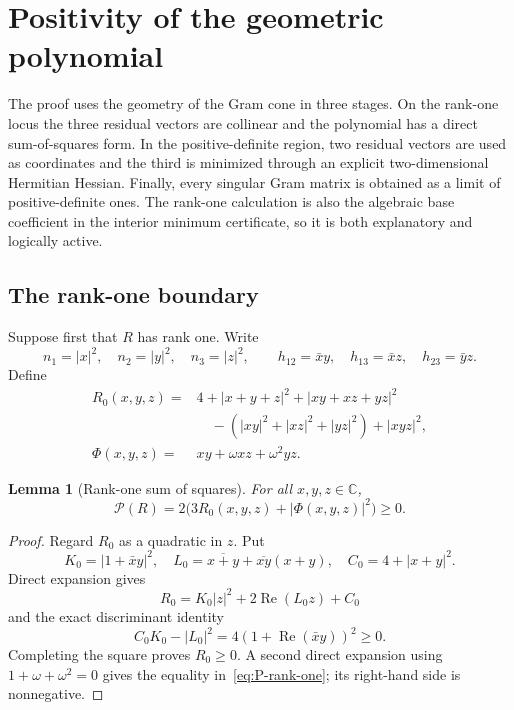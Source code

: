 \documentclass[11pt]{article}
\newtheorem{lemma}[theorem]{Lemma}
\theoremstyle{definition}
\newcommand{\CC}{\mathbb C}
\newcommand{\Rea}{\operatorname{Re}}
\begin{document}
\section{Positivity of the geometric polynomial}\label{sec:Ppositive}

The proof uses the geometry of the Gram cone in three stages.  On the
rank-one locus the three residual vectors are collinear and the polynomial
has a direct sum-of-squares form.  In the positive-definite region, two
residual vectors are used as coordinates and the third is minimized through
an explicit two-dimensional Hermitian Hessian.  Finally, every singular Gram
matrix is obtained as a limit of positive-definite ones.  The rank-one
calculation is also the algebraic base coefficient in the interior minimum
certificate, so it is both explanatory and logically active.

\subsection{The rank-one boundary}

Suppose first that $R$ has rank one.  Write
\[
 n_1=|x|^2,\quad n_2=|y|^2,\quad n_3=|z|^2,\qquad
 h_{12}=\bar xy,\quad h_{13}=\bar xz,\quad h_{23}=\bar yz.
\]
Define
\begin{align}
 R_0(x,y,z)={}&4+|x+y+z|^2+|xy+xz+yz|^2\nonumber\\
 &\quad-(|xy|^2+|xz|^2+|yz|^2)+|xyz|^2,\label{eq:R0}\\
 \Phi(x,y,z)={}&xy+\omega xz+\omega^2yz.
\end{align}

\begin{lemma}[Rank-one sum of squares]\label{lem:rank-one-sos}
For all $x,y,z\in\CC$,
\begin{equation}\label{eq:P-rank-one}
 \mathcal P(R)=2\bigl(3R_0(x,y,z)+|\Phi(x,y,z)|^2\bigr)\geq0.
\end{equation}
\end{lemma}

\begin{proof}
Regard $R_0$ as a quadratic in $z$.  Put
\[
 K_0=|1+\bar xy|^2,\quad
 L_0=\overline{x+y}+\overline{xy}(x+y),\quad
 C_0=4+|x+y|^2.
\]
Direct expansion gives
\[
 R_0=K_0|z|^2+2\Rea(L_0z)+C_0
\]
and the exact discriminant identity
\[
 C_0K_0-|L_0|^2=4(1+\Rea(\bar xy))^2\geq0.
\]
Completing the square proves $R_0\geq0$.  A second direct expansion using
$1+\omega+\omega^2=0$ gives the equality in~\eqref{eq:P-rank-one}; its
right-hand side is nonnegative.
\end{proof}
\end{document}
